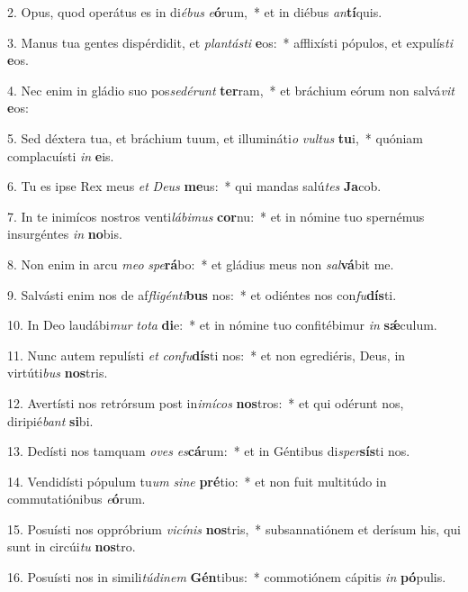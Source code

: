 2. Opus, quod operátus es in di\textit{é}\textit{bus} \textit{e}\textbf{ó}rum,~*  et in diébus \textit{an}\textbf{tí}quis.\

3. Manus tua gentes dispérdidit, et \textit{plan}\textit{tás}\textit{ti} \textbf{e}os:~*  afflixísti pópulos, et expulís\textit{ti} \textbf{e}os.\

4. Nec enim in gládio suo pos\textit{se}\textit{dé}\textit{runt} \textbf{ter}ram,~*  et bráchium eórum non salvá\textit{vit} \textbf{e}os:\

5. Sed déxtera tua, et bráchium tuum, et illumináti\textit{o} \textit{vul}\textit{tus} \textbf{tu}i,~*  quóniam complacuísti \textit{in} \textbf{e}is.\

6. Tu es ipse Rex meus \textit{et} \textit{De}\textit{us} \textbf{me}us:~*  qui mandas salú\textit{tes} \textbf{Ja}cob.\

7. In te inimícos nostros venti\textit{lá}\textit{bi}\textit{mus} \textbf{cor}nu:~*  et in nómine tuo spernémus insurgéntes \textit{in} \textbf{no}bis.\

8. Non enim in arcu \textit{me}\textit{o} \textit{spe}\textbf{rá}bo:~*  et gládius meus non \textit{sal}\textbf{vá}bit me.\

9. Salvásti enim nos de af\textit{fli}\textit{gén}\textit{ti}\textbf{bus} nos:~*  et odiéntes nos con\textit{fu}\textbf{dís}ti.\

10. In Deo laudábi\textit{mur} \textit{to}\textit{ta} \textbf{di}e:~*  et in nómine tuo confitébimur \textit{in} \textbf{sǽ}culum.\

11. Nunc autem repulísti \textit{et} \textit{con}\textit{fu}\textbf{dís}ti nos:~*  et non egrediéris, Deus, in virtúti\textit{bus} \textbf{nos}tris.\

12. Avertísti nos retrórsum post in\textit{i}\textit{mí}\textit{cos} \textbf{nos}tros:~*  et qui odérunt nos, diripié\textit{bant} \textbf{si}bi.\

13. Dedísti nos tamquam \textit{o}\textit{ves} \textit{es}\textbf{cá}rum:~*  et in Géntibus di\textit{sper}\textbf{sís}ti nos.\

14. Vendidísti pópulum tu\textit{um} \textit{si}\textit{ne} \textbf{pré}tio:~*  et non fuit multitúdo in commutatiónibus \textit{e}\textbf{ó}rum.\

15. Posuísti nos oppróbrium \textit{vi}\textit{cí}\textit{nis} \textbf{nos}tris,~*  subsannatiónem et derísum his, qui sunt in circúi\textit{tu} \textbf{nos}tro.\

16. Posuísti nos in simili\textit{tú}\textit{di}\textit{nem} \textbf{Gén}tibus:~*  commotiónem cápitis \textit{in} \textbf{pó}pulis.\

